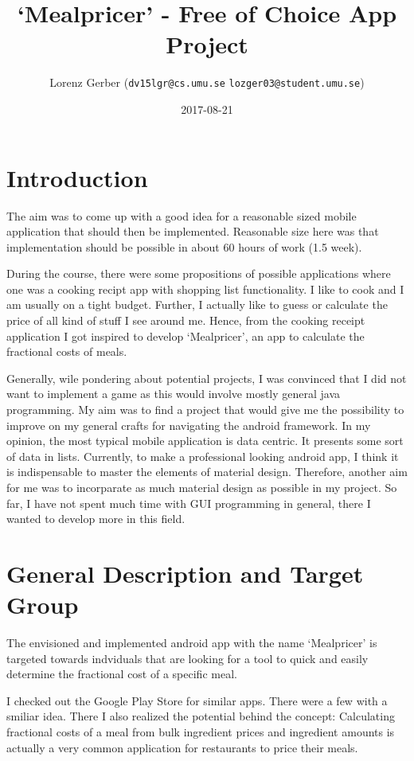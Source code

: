 \documentclass[a4paper,11pt,twoside]{article}
\title{`Mealpricer' - Free of Choice App Project}
\author{Lorenz Gerber ({\tt{dv15lgr@cs.umu.se}} {\tt{lozger03@student.umu.se}})}
\date{2017-08-21}
\begin{document}
\lstset{language=C}
\maketitle
\thispagestyle{empty}
\newpage
\tableofcontents
\thispagestyle{empty}
\newpage

\clearpage
{}

\section{Introduction}
The aim was to come up with a good idea for a reasonable sized mobile application
that should then be implemented. Reasonable size here was that implementation should
be possible in about 60 hours of work (1.5 week).

During the course, there were some propositions of possible applications where one
was a cooking recipt app with shopping list functionality. I like to cook and I am
usually on a tight budget. Further, I actually like to guess or calculate the price
of all kind of stuff I see around me. Hence, from the cooking receipt application I got
inspired to develop `Mealpricer', an app to calculate the fractional costs of meals.

Generally, wile pondering about potential projects, I was convinced that I did not
want to implement a game as this would involve mostly general java programming. My
aim was to find a project that would give me the possibility to improve on my
general crafts for navigating the android framework. In my opinion, the most typical
mobile application is data centric. It presents some sort of data in lists. Currently,
to make a professional looking android app, I think it is indispensable to master the
elements of material design. Therefore, another aim for me was to incorparate
as much material design as possible in my project. So far, I have not spent much
time with GUI programming in general, there I wanted to develop more in this field.


\section{General Description and Target Group}
The envisioned and implemented android app with the name `Mealpricer' is
targeted towards indviduals that are looking for a tool to quick and easily determine
the fractional cost of a specific meal.

I checked out the Google Play Store for similar apps. There were a few with a
smiliar idea. There I also realized the potential behind the
concept: Calculating fractional costs of a meal from bulk ingredient prices and
ingredient amounts is actually a very common application for restaurants to price
their meals.
\end{document}
